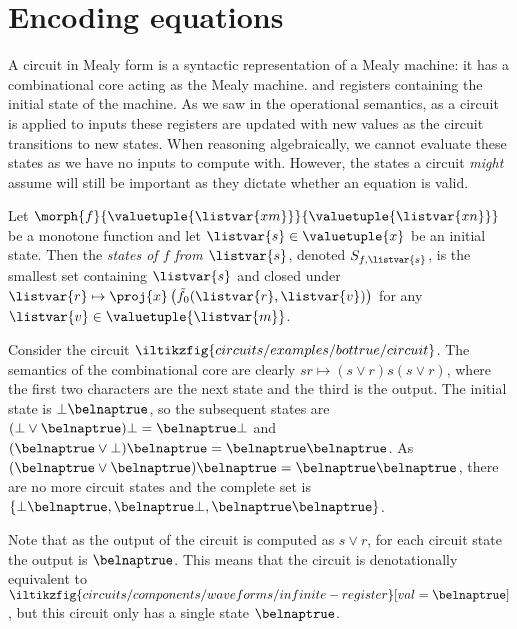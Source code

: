 \section{Encoding equations}

A circuit in Mealy form is a syntactic representation of a Mealy machine: it
has a combinational core acting as the Mealy machine. and registers containing
the initial state of the machine.
As we saw in the operational semantics, as a circuit is applied to inputs these
registers are updated with new values as the circuit transitions to new states.
When reasoning algebraically, we cannot evaluate these states as we have no
inputs to compute with.
However, the states a circuit \emph{might} assume will still be important as
they dictate whether an equation is valid.

\begin{definition}[States]
    Let \(\morph{f}{\valuetuple{\listvar{xm}}}{\valuetuple{\listvar{xn}}}\) be a
    monotone function and let \(\listvar{s} \in  \valuetuple{x}\) be an
    initial state.
    Then the \emph{states of \(f\) from \(\listvar{s}\)}, denoted
    \(S_{f,\listvar{s}}\), is the smallest set containing \(\listvar{s}\) and
    closed under \(
    \listvar{r}
    \mapsto
    \proj{x}\left(\tilde{f}_0(\listvar{r},\listvar{v})\right)
    \) for any \(\listvar{v} \in \valuetuple{\listvar{m}}\).
\end{definition}

\begin{example}\label{ex:circuit-states}
    Consider the circuit \(
    \iltikzfig{circuits/examples/bottrue/circuit}
    \).
    The semantics of the combinational core are clearly
    \(sr \mapsto (s \lor r)s(s \lor r)\), where the first two characters are the
    next state and the third is the output.
    The initial state is \(\bot\belnaptrue\), so the subsequent states are
    \((\bot \lor \belnaptrue)\bot = \belnaptrue\bot\) and
    \((\belnaptrue \lor \bot)\belnaptrue = \belnaptrue\belnaptrue\).
    As \((\belnaptrue \lor \belnaptrue)\belnaptrue = \belnaptrue\belnaptrue\),
    there are no more circuit states and the complete set is
    \(\{\bot\belnaptrue,\belnaptrue\bot,\belnaptrue\belnaptrue\}\).

    Note that as the output of the circuit is computed as \(s \lor r\), for each
    circuit state the output is \(\belnaptrue\).
    This means that the circuit is denotationally equivalent to \(
    \iltikzfig{circuits/components/waveforms/infinite-register}[val=\belnaptrue]
    \), but this circuit only has a single state \(\belnaptrue\).
\end{example}


